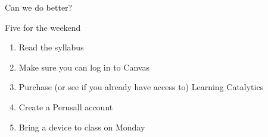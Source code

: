\documentclass{beamer}\usepackage[]{graphicx}\usepackage[]{color}
\newenvironment{knitrout}{}{} %
\begin{document}
\begin{darkframes}
\begin{frame}{Can we do better?}
\begin{knitrout}


\end{knitrout}
    \end{frame}

    \begin{frame}{Five for the weekend}
      \begin{enumerate}
        \item Read the syllabus
        \item Make sure you can log in to Canvas
        \item Purchase (or see if you already have access to) Learning Catalytics
        \item Create a Perusall account
        \item Bring a device to class on Monday
      \end{enumerate}
    \end{frame}


  \end{darkframes}
\end{document}
